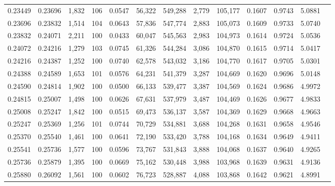 \begin{tabular}{rrrrrrrrrrrrr}
0.23449 & 0.23696 & 1,832 & 106 &                                     0.0547 &  56,322 & 549,288 &   2,779 & 105,177 & 0.1607 & 0.9743 & 5.0881 \\
0.23696 & 0.23832 & 1,514 & 104 &                                     0.0643 &  57,836 & 547,774 &   2,883 & 105,073 & 0.1609 & 0.9733 & 5.0740 \\
0.23832 & 0.24071 & 2,211 & 100 &                                     0.0433 &  60,047 & 545,563 &   2,983 & 104,973 & 0.1614 & 0.9724 & 5.0536 \\
0.24072 & 0.24216 & 1,279 & 103 &                                     0.0745 &  61,326 & 544,284 &   3,086 & 104,870 & 0.1615 & 0.9714 & 5.0417 \\
0.24216 & 0.24387 & 1,252 & 100 &                                     0.0740 &  62,578 & 543,032 &   3,186 & 104,770 & 0.1617 & 0.9705 & 5.0301 \\
0.24388 & 0.24589 & 1,653 & 101 &                                     0.0576 &  64,231 & 541,379 &   3,287 & 104,669 & 0.1620 & 0.9696 & 5.0148 \\
0.24590 & 0.24814 & 1,902 & 100 &                                     0.0500 &  66,133 & 539,477 &   3,387 & 104,569 & 0.1624 & 0.9686 & 4.9972 \\
0.24815 & 0.25007 & 1,498 & 100 &                                     0.0626 &  67,631 & 537,979 &   3,487 & 104,469 & 0.1626 & 0.9677 & 4.9833 \\
0.25008 & 0.25247 & 1,842 & 100 &                                     0.0515 &  69,473 & 536,137 &   3,587 & 104,369 & 0.1629 & 0.9668 & 4.9663 \\
0.25247 & 0.25369 & 1,256 & 101 &                                     0.0744 &  70,729 & 534,881 &   3,688 & 104,268 & 0.1631 & 0.9658 & 4.9546 \\
0.25370 & 0.25540 & 1,461 & 100 &                                     0.0641 &  72,190 & 533,420 &   3,788 & 104,168 & 0.1634 & 0.9649 & 4.9411 \\
0.25541 & 0.25736 & 1,577 & 100 &                                     0.0596 &  73,767 & 531,843 &   3,888 & 104,068 & 0.1637 & 0.9640 & 4.9265 \\
0.25736 & 0.25879 & 1,395 & 100 &                                     0.0669 &  75,162 & 530,448 &   3,988 & 103,968 & 0.1639 & 0.9631 & 4.9136 \\
0.25880 & 0.26092 & 1,561 & 100 &                                     0.0602 &  76,723 & 528,887 &   4,088 & 103,868 & 0.1642 & 0.9621 & 4.8991 \\

\end{tabular}
